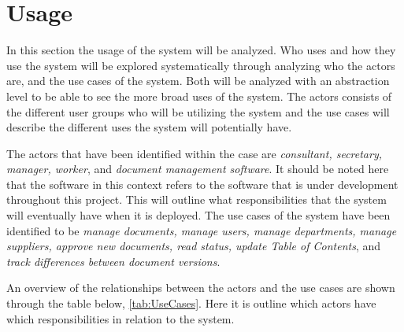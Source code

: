 \section{Usage}\label{sec:Usage}

In this section the usage of the system will be analyzed. 
Who uses and how they use the system will be explored systematically through analyzing who the actors are, and the use cases of the system.
Both will be analyzed with an abstraction level to be able to see the more broad uses of the system.
The actors consists of the different user groups who will be utilizing the system and the use cases will describe the different uses the system will potentially have.

The actors that have been identified within the case are \textit{consultant, secretary, manager, worker}, and \textit{document management software}.
It should be noted here that the software in this context refers to the software that is under development throughout this project.
This will outline what responsibilities that the system will eventually have when it is deployed.
The use cases of the system have been identified to be \textit{manage documents, manage users, manage departments, manage suppliers, approve new documents, read status, update Table of Contents}, and \textit{track differences between document versions}.

An overview of the relationships between the actors and the use cases are shown through the table below, \cref{tab:UseCases}.
Here it is outline which actors have which responsibilities in relation to the system.


